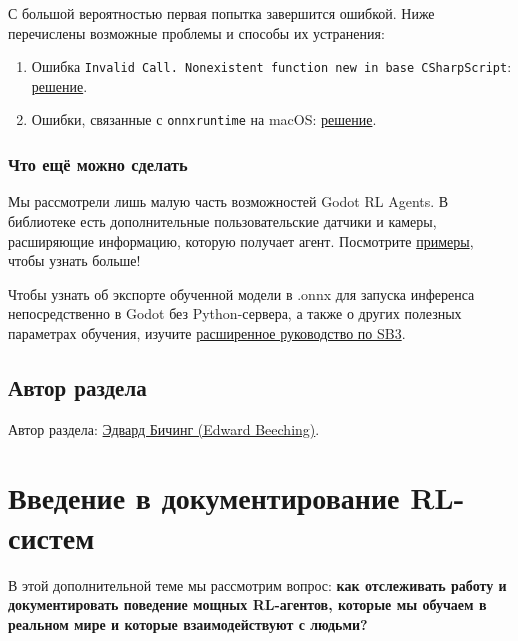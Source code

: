\documentclass[11pt,a4paper]{article}
\begin{document}
С большой вероятностью первая попытка завершится ошибкой. Ниже перечислены возможные проблемы и способы их устранения:

\begin{enumerate}
\def\labelenumi{\arabic{enumi}.}
\item
  Ошибка \texttt{Invalid\ Call.\ Nonexistent\ function\ \textquotesingle{}new\textquotesingle{}\ in\ base\ \textquotesingle{}CSharpScript\textquotesingle{}}: \href{https://github.com/edbeeching/godot_rl_agents/blob/main/docs/TROUBLESHOOTING.md}{решение}.
\item
  Ошибки, связанные с \texttt{onnxruntime} на macOS: \href{https://github.com/microsoft/onnxruntime/issues/9707}{решение}.
\end{enumerate}

\subsubsection{Что ещё можно сделать}\label{theres-more}

Мы рассмотрели лишь малую часть возможностей Godot RL Agents. В библиотеке есть дополнительные пользовательские датчики и камеры, расширяющие информацию, которую получает агент. Посмотрите \href{https://github.com/edbeeching/godot_rl_agents_examples}{примеры}, чтобы узнать больше!

Чтобы узнать об экспорте обученной модели в .onnx для запуска инференса непосредственно в Godot без Python-сервера, а также о других полезных параметрах обучения, изучите \href{https://github.com/edbeeching/godot_rl_agents/blob/main/docs/ADV_STABLE_BASELINES_3.md}{расширенное руководство по SB3}.

\subsection{Автор раздела}\label{author-6}

Автор раздела: \href{https://twitter.com/edwardbeeching}{Эдвард Бичинг (Edward Beeching)}.

\section{Введение в документирование RL-систем}\label{brief-introduction-to-rl-documentation}

В этой дополнительной теме мы рассмотрим вопрос: \textbf{как отслеживать работу и документировать поведение мощных RL-агентов, которые мы обучаем в реальном мире и которые взаимодействуют с людьми?}
\end{document}
